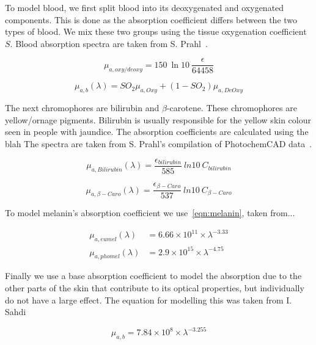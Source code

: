 To model blood, we first split blood into its deoxygenated and oxygenated components.
This is done as the absorption coefficient differs between the two types of blood. We mix these two groups using the tissue oxygenation coefficient $S$. Blood absorption spectra are taken from S. Prahl~\cite{prahlblood}.

\begin{equation}
\mu_{a,oxy/deoxy}=150\ \ln10\ \frac{\epsilon}{64458}
\label{eqn:oxy}
\end{equation}

\begin{equation}
\mu_{a,b}(\lambda) = SO_2\mu_{a,Oxy}+(1-SO_2)\mu_{a,DeOxy}
\label{eqn:blood}
\end{equation}

The next chromophores are bilirubin and $\beta$-carotene.
These chromophores are yellow/ornage pigments. 
Bilirubin is usually responsible for the yellow skin colour seen in people with jaundice.
The absorption coefficients are calculated using the blah 
The spectra are taken from S. Prahl's compilation of PhotochemCAD data~\cite{prahlcaro,prahlbili}.

\begin{equation}
\mu_{a,Bilirubin}(\lambda)=\frac{\epsilon_{bilirubin}}{585}\ ln10\ C_{bilirubin}
\label{eqn:bili}
\end{equation}

\begin{equation}
\mu_{a,\beta-Caro}(\lambda)=\frac{\epsilon_{\beta-Caro}}{537}\ ln10\ C_{\beta-Caro}
\label{eqn:caro}
\end{equation}

To model melanin's absorption coefficient we use~\cref{eqn:melanin}, taken from...

\begin{align}
\mu_{a,eumel}(\lambda)&=6.66\times10^{11} \times \lambda^{-3.33}\\
\mu_{a,phomel}(\lambda)&=2.9\times10^{15} \times \lambda^{-4.75}
\label{eqn:melanin}
\end{align}

Finally we use a base absorption coefficient to model the absorption due to the other parts of the skin that contribute to its optical properties, but individually do not have a large effect.
The equation for modelling this was taken from I. Sahdi~\cite{saidi1992transcutaneous}

\begin{equation}
\mu_{a,b}=7.84\times10^{8}\times\lambda^{-3.255}
\label{eqn:base}
\end{equation}


